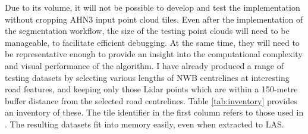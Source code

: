 Due to its volume, it will not be possible to develop and test the implementation without cropping AHN3 input point cloud tiles. Even after the implementation of the segmentation workflow, the size of the testing point clouds will need to be manageable, to facilitate efficient debugging. At the same time, they will need to be representative enough to provide an insight into the computational complexity and visual performance of the algorithm. I have already produced a range of testing datasets by selecting various lengths of NWB centrelines at interesting road features, and keeping only those Lidar points which are within a 150-metre buffer distance from the selected road centrelines. Table \ref{tab:inventory} provides an inventory of these. The tile identifier in the first column refers to those used in \cite{ahn3_download}. The resulting datasets fit into memory easily, even when extracted to LAS.

